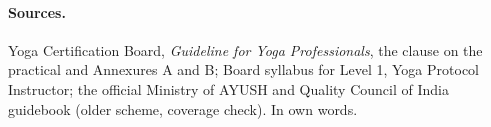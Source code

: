 \paragraph{Sources.} Yoga Certification Board, \emph{Guideline for Yoga Professionals}, the clause on the practical and Annexures A and B; Board syllabus for Level 1, Yoga Protocol Instructor; the official Ministry of AYUSH and Quality Council of India guidebook (older scheme, coverage check). In own words.
